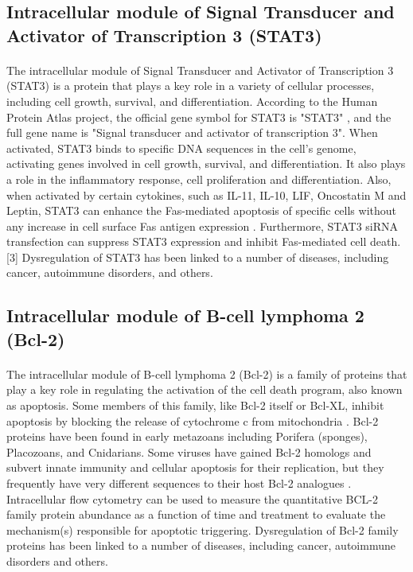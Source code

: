 \subsection{Intracellular module of Signal Transducer and Activator of Transcription 3 (STAT3)}
\paragraph{}

The intracellular module of Signal Transducer and Activator of Transcription 3 (STAT3) is a protein that plays a key role in a variety of cellular processes, including cell growth, survival, and differentiation. According to the Human Protein Atlas project, the official gene symbol for STAT3 is "STAT3" \cite{stat3}, and the full gene name is "Signal transducer and activator of transcription 3". When activated, STAT3 binds to specific DNA sequences in the cell's genome, activating genes involved in cell growth, survival, and differentiation. It also plays a role in the inflammatory response, cell proliferation and differentiation. Also, when activated by certain cytokines, such as IL-11, IL-10, LIF, Oncostatin M and Leptin, STAT3 can enhance the Fas-mediated apoptosis of specific cells without any increase in cell surface Fas antigen expression \cite{tanaka2011stat3}. Furthermore, STAT3 siRNA transfection can suppress STAT3 expression and inhibit Fas-mediated cell death. [3] Dysregulation of STAT3 has been linked to a number of diseases, including cancer, autoimmune disorders, and others.

\subsection{Intracellular module of B-cell lymphoma 2 (Bcl-2)}
\paragraph{}

The intracellular module of B-cell lymphoma 2 (Bcl-2) is a family of proteins that play a key role in regulating the activation of the cell death program, also known as apoptosis. Some members of this family, like Bcl-2 itself or Bcl-XL, inhibit apoptosis by blocking the release of cytochrome c from mitochondria \cite{alberts2002programmed}. Bcl-2 proteins have been found in early metazoans including Porifera (sponges), Placozoans, and Cnidarians. Some viruses have gained Bcl-2 homologs and subvert innate immunity and cellular apoptosis for their replication, but they frequently have very different sequences to their host Bcl-2 analogues \cite{banjara2020bcl}. Intracellular flow cytometry can be used to measure the quantitative BCL-2 family protein abundance as a function of time and treatment to evaluate the mechanism(s) responsible for apoptotic triggering. Dysregulation of Bcl-2 family proteins has been linked to a number of diseases, including cancer, autoimmune disorders and others.

